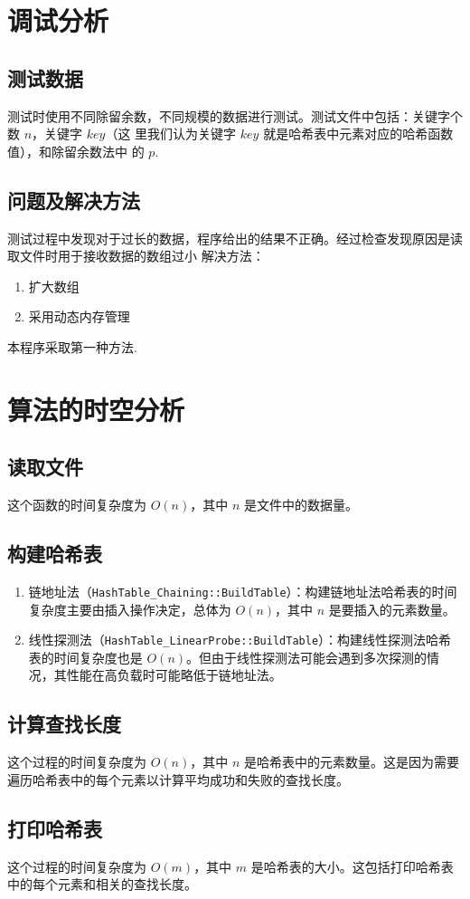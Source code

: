 \documentclass[UTF8]{ctexart}
\begin{document}
\section{调试分析}
\subsection{测试数据}
测试时使用不同除留余数，不同规模的数据进行测试。测试文件中包括：关键字个数 $n$，关键字 $key$（这
里我们认为关键字 $key$ 就是哈希表中元素对应的哈希函数值），和除留余数法中
的 $p$.
\subsection{问题及解决方法}
测试过程中发现对于过长的数据，程序给出的结果不正确。经过检查发现原因是读取文件时用于接收数据的数组过小
解决方法：
\begin{enumerate}
  \item 扩大数组
  \item 采用动态内存管理
\end{enumerate}
本程序采取第一种方法.
\section{算法的时空分析}
\subsection{读取文件}
这个函数的时间复杂度为 $O(n)$，其中 $n$ 是文件中的数据量。
\subsection{构建哈希表}
\begin{enumerate}
  \item 链地址法（\lstinline{HashTable_Chaining::BuildTable}）：构建链地址法哈希表的时间复杂度主要由插入操作决定，总体为 $O(n)$，其中 $n$ 是要插入的元素数量。
  \item 线性探测法（\lstinline{HashTable_LinearProbe::BuildTable}）：构建线性探测法哈希表的时间复杂度也是 $O(n)$。但由于线性探测法可能会遇到多次探测的情况，其性能在高负载时可能略低于链地址法。
\end{enumerate}
\subsection{计算查找长度}
这个过程的时间复杂度为 $O(n)$，其中 $n$ 是哈希表中的元素数量。这是因为需要遍历哈希表中的每个元素以计算平均成功和失败的查找长度。
\subsection{打印哈希表}
这个过程的时间复杂度为 $O(m)$，其中 $m$ 是哈希表的大小。这包括打印哈希表中的每个元素和相关的查找长度。
\end{document}
